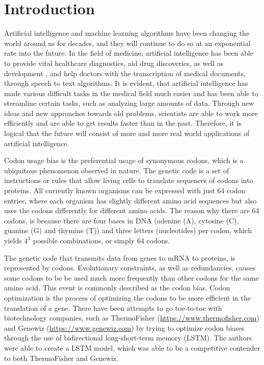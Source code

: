\documentclass[conference]{IEEEtran}
\begin{document}
\section{Introduction}
Artificial intelligence and machine learning algorithms have been changing the world around us for decades, and they will continue to do so at an exponential rate into the future\cite{Ray}. In the field of medicine, artificial intelligence has been able to provide vital healthcare diagnostics\cite{Kumar}, aid drug discoveries\cite{Deng}, as well as development \cite{Paul}, and help doctors with the transcription of medical documents, through speech to text algorithms\cite{Li}. It is evident, that artificial intelligence has made various difficult tasks in the medical field much easier\cite{Briganti}\cite{Davenport} and has been able to streamline certain tasks, such as analyzing large amounts of data\cite{Rahmani}. Through new ideas and new approaches towards old problems, scientists are able to work more efficiently and are able to get results faster than in the past\cite{Rajpurkar}. Therefore, it is logical that the future will consist of more and more real world applications of artificial intelligence. 

Codon usage bias is the preferential usage of synonymous codons, which is a ubiquitous phenomenon observed in nature\cite{Parvathy}. The genetic code is a set of instructions or rules that allow living cells to translate sequences of codons into proteins\cite{Kooning}. All currently known organisms can be expressed with just 64 codon entries, where each organism has slightly different amino acid sequences but also uses the codons differently for different amino acids\cite{Zhou}. The reason why there are 64 codons, is because there are four bases in DNA (adenine (A), cytosine (C), guanine (G) and thymine (T)) and three letters (nucleotides) per codon, which yields $4^3$ possible combinations, or simply 64 codons.

The genetic code that transmits data from genes to mRNA to proteins, is represented by codons. Evolutionary constraints, as well as redundancies, causes some codons to be be used much more frequently than other codons for the same amino acid. This event is commonly described as the codon bias. Codon optimization is the process of optimizing the codons to be more efficient in the translation of a gene. There have been attempts to go toe-to-toe with biotechnology companies\cite{Fu}, such as ThermoFisher (\url{https://www.thermofisher.com}) and Genewiz (\url{https://www.genewiz.com}) by trying to optimize codon biases through the use of bidirectional long-short-term memory (LSTM)\cite{Hochreiter}\cite{Cui}. The authors were able to create a LSTM model, which was able to be a competitive contender to both ThermoFisher and Genewiz. 
\end{document}
